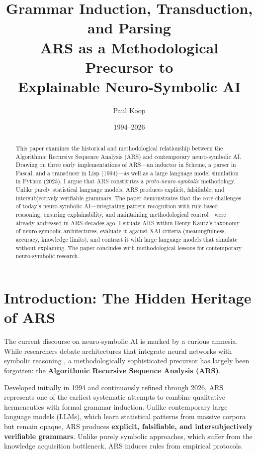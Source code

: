 \documentclass[12pt,a4paper]{article}
\title{\Huge\textbf{Grammar Induction, Transduction, and Parsing} \\
       \LARGE ARS as a Methodological Precursor to \\[2mm]
       \LARGE Explainable Neuro-Symbolic AI}
\author{
  \large
  \begin{tabular}{c}
    Paul Koop
  \end{tabular}
}
\date{\large 1994--2026}
\begin{document}
\maketitle

\begin{abstract}
This paper examines the historical and methodological relationship between the 
Algorithmic Recursive Sequence Analysis (ARS) and contemporary neuro-symbolic 
AI. Drawing on three early implementations of ARS—an inductor in Scheme, a parser 
in Pascal, and a transducer in Lisp (1994)—as well as a large language model 
simulation in Python (2023), I argue that ARS constitutes a \textit{proto-neuro-symbolic} 
methodology. Unlike purely statistical language models, ARS produces explicit, 
falsifiable, and intersubjectively verifiable grammars. The paper demonstrates 
that the core challenges of today's neuro-symbolic AI—integrating pattern 
recognition with rule-based reasoning, ensuring explainability, and maintaining 
methodological control—were already addressed in ARS decades ago. I situate ARS 
within Henry Kautz's taxonomy of neuro-symbolic architectures, evaluate it 
against XAI criteria (meaningfulness, accuracy, knowledge limits), and contrast 
it with large language models that simulate without explaining. The paper 
concludes with methodological lessons for contemporary neuro-symbolic research.
\end{abstract}

\newpage
\tableofcontents
\newpage

\section{Introduction: The Hidden Heritage of ARS}

The current discourse on neuro-symbolic AI is marked by a curious amnesia. 
While researchers debate architectures that integrate neural networks with 
symbolic reasoning \citep{hitzler2022neuro, garcez2020neurosymbolic}, a 
methodologically sophisticated precursor has largely been forgotten: the 
\textbf{Algorithmic Recursive Sequence Analysis (ARS)}.

Developed initially in 1994 and continuously refined through 2026, ARS 
represents one of the earliest systematic attempts to combine qualitative 
hermeneutics with formal grammar induction. Unlike contemporary large language 
models (LLMs), which learn statistical patterns from massive corpora but remain 
opaque, ARS produces \textbf{explicit, falsifiable, and intersubjectively 
verifiable grammars}. Unlike purely symbolic approaches, which suffer from 
the knowledge acquisition bottleneck, ARS induces rules from empirical 
protocols.
\end{document}
